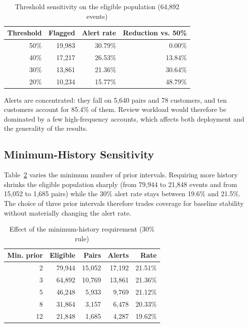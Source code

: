 \documentclass[conference]{IEEEtran}
\begin{document}
\begin{table}[t]
\caption{Threshold sensitivity on the eligible population (64,892 events)}
\label{tab:threshold}
\centering
\footnotesize
\begin{tabular}{rrrr}
\toprule
\textbf{Threshold} & \textbf{Flagged} & \textbf{Alert rate} & \textbf{Reduction vs. 50\%}\\
\midrule
50\% & 19,983 & 30.79\% & 0.00\%\\
40\% & 17,217 & 26.53\% & 13.84\%\\
30\% & 13,861 & 21.36\% & 30.64\%\\
20\% & 10,234 & 15.77\% & 48.79\%\\
\bottomrule
\end{tabular}
\end{table}

Alerts are concentrated: they fall on 5,640 pairs and 78 customers, and ten customers account for 85.4\% of them. Review workload would therefore be dominated by a few high-frequency accounts, which affects both deployment and the generality of the results.

\subsection{Minimum-History Sensitivity}\label{sec:minhist}
Table~\ref{tab:minhist} varies the minimum number of prior intervals. Requiring more history shrinks the eligible population sharply (from 79,944 to 21,848 events and from 15,052 to 1,685 pairs) while the 30\% alert rate stays between 19.6\% and 21.5\%. The choice of three prior intervals therefore trades coverage for baseline stability without materially changing the alert rate.

\begin{table}[t]
\caption{Effect of the minimum-history requirement (30\% rule)}
\label{tab:minhist}
\centering
\footnotesize
\begin{tabular}{rrrrr}
\toprule
\textbf{Min. prior} & \textbf{Eligible} & \textbf{Pairs} & \textbf{Alerts} & \textbf{Rate}\\
\midrule
2 & 79,944 & 15,052 & 17,192 & 21.51\%\\
3 & 64,892 & 10,769 & 13,861 & 21.36\%\\
5 & 46,248 & 5,933 & 9,769 & 21.12\%\\
8 & 31,864 & 3,157 & 6,478 & 20.33\%\\
12 & 21,848 & 1,685 & 4,287 & 19.62\%\\
\bottomrule
\end{tabular}
\end{table}
\end{document}
